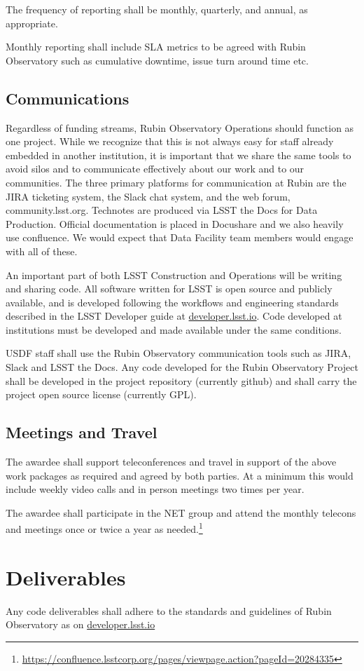 \reqsimp{}{}{}{}{}
{
The frequency of reporting shall be monthly, quarterly, and annual, as
appropriate.
}

\reqsimp{}{}{}{}{}
{
Monthly reporting shall include SLA metrics to be agreed with Rubin Observatory
such as cumulative downtime, issue turn around time etc.
}

\subsection{Communications}
Regardless of funding streams, Rubin Observatory \gls{Operations} should function as one project.
While we recognize that this is not always easy for staff already embedded in another institution, it is important that we share the same tools to avoid silos and to communicate effectively about our work and to our communities.
The three primary platforms for communication at Rubin are the \gls{JIRA} ticketing system, the Slack chat system, and the web forum, community.lsst.org. Technotes are produced via LSST the Docs  for Data Production. Official documentation is placed in Docushare and we also heavily use confluence. We would expect that Data Facility team members would engage with all of these.

An important part of both LSST Construction and Operations will be writing and sharing code.
All software written for \gls{LSST} is open source and publicly available, and is developed following the workflows and engineering standards described in the LSST Developer guide at \url{developer.lsst.io}.
Code developed at institutions must be developed and made available under the same conditions.


\reqsimp{}{}{}{}{}
{
\gls{USDF} staff shall use the Rubin Observatory communication tools such as JIRA, Slack and LSST the Docs.
}
\reqsimp{}{}{}{}{}
{
Any code developed for the Rubin Observatory Project shall be developed in the project repository (currently github) and shall carry the project open source license (currently \gls{GPL}).
}


\subsection{Meetings and Travel}

\reqsimp{}{}{}{}{}
{
The awardee shall support  teleconferences  and travel in support of the
above work packages as required and agreed by both parties. At a minimum this
would include weekly video calls and in person meetings two times per year.
}

\reqsimp{}{}{}{}{}
{
The awardee shall participate in the NET group and attend the monthly telecons and meetings once or twice a year
as needed.\footnote{\url{https://confluence.lsstcorp.org/pages/viewpage.action?pageId=20284335}}
}

\section{Deliverables}

\reqsimp{}{}{}{}{}
{
Any code deliverables shall adhere to the standards and guidelines of
Rubin Observatory as on \url{developer.lsst.io}
}
